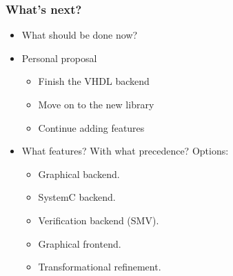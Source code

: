 \documentclass{beamer}
\begin{document}
\begin{frame}
  \frametitle{What's next?}
 \begin{itemize}
 \item What should be done now?
 \item Personal proposal
  \begin{itemize}
   \item Finish the VHDL backend
   \item Move on to the new library
   \item Continue adding features
  \end{itemize}
  \item What features? With what precedence? Options:
    \begin{itemize}
     \item Graphical backend.
     \item SystemC backend.
     \item Verification backend (SMV).
     \item Graphical frontend.
     \item Transformational refinement.
    \end{itemize} 
 \end{itemize}
\end{frame}
\end{document}

